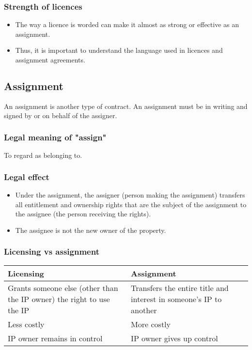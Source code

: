 \documentclass[11pt]{article}
\begin{document}
\subsubsection{Strength of licences}
\label{sec:org52542fe}
\begin{itemize}
\item The way a licence is worded can make it almost as strong or effective as an assignment.
\item Thus, it is important to understand the language used in licences and assignment agreements.
\end{itemize}

 \newpage

\subsection{Assignment}
\label{sec:org06d4bf1}
An assignment is another type of contract. An assignment must be in writing and signed by or on behalf of the assigner.

\subsubsection{Legal meaning of "assign"}
\label{sec:org3b7b575}
To regard as belonging to.

\subsubsection{Legal effect}
\label{sec:org750b57c}
\begin{itemize}
\item Under the assignment, the assigner (person making the assignment) transfers all entitlement and ownership rights that are the subject of the assignment to the assignee (the person receiving the rights).
\item The assignee is not the new owner of the property.
\end{itemize}

\subsubsection{Licensing vs assignment}
\label{sec:org34786cc}
\begin{center}
\begin{tabular}{m{16em}|m{16em}}
Licensing & Assignment\\[0pt]
\hline
Grants someone else (other than the IP owner) the right to use the IP & Transfers the entire title and interest in someone's IP to another\\[0pt]
\hline
Less costly & More costly\\[0pt]
\hline
IP owner remains in control & IP owner gives up control\\[0pt]
\end{tabular}
\end{center}
\end{document}
